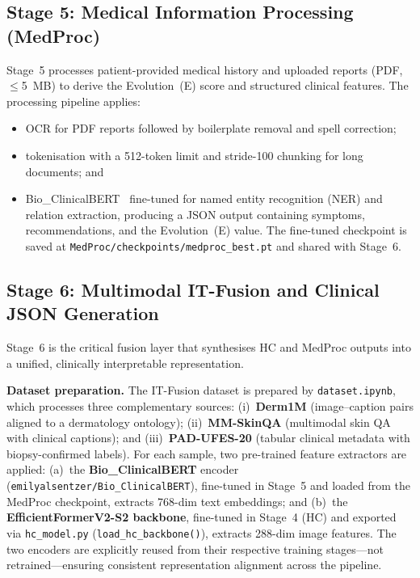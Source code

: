 \documentclass[conference]{IEEEtran}
\begin{document}
\subsection{Stage 5: Medical Information Processing (MedProc)}

Stage~5 processes patient-provided medical history and uploaded reports
(PDF, $\leq$5~MB) to derive the Evolution~(E) score and structured
clinical features. The processing pipeline applies:
\begin{itemize}[leftmargin=*]
    \item OCR for PDF reports followed by boilerplate removal and spell
          correction;
    \item tokenisation with a 512-token limit and stride-100 chunking
          for long documents; and
    \item Bio\_ClinicalBERT~\cite{alsentzer2019_bioclinicalbert} fine-tuned for named entity
          recognition (NER) and relation extraction, producing a JSON output
          containing symptoms, recommendations, and the Evolution~(E) value.
          The fine-tuned checkpoint is saved at
          \texttt{MedProc/checkpoints/medproc\_best.pt} and shared with Stage~6.
\end{itemize}

\subsection{Stage 6: Multimodal IT-Fusion and Clinical JSON Generation}

Stage~6 is the critical fusion layer that synthesises HC and MedProc
outputs into a unified, clinically interpretable representation.

\textbf{Dataset preparation.} The IT-Fusion dataset is prepared by
\texttt{dataset.ipynb}, which processes three complementary sources:
(i)~\textbf{Derm1M} (image--caption pairs aligned to a dermatology
ontology); (ii)~\textbf{MM-SkinQA} (multimodal skin QA with clinical
captions); and (iii)~\textbf{PAD-UFES-20} (tabular clinical metadata
with biopsy-confirmed labels). For each sample, two pre-trained feature
extractors are applied: (a)~the \textbf{Bio\_ClinicalBERT} encoder
(\texttt{emilyalsentzer/Bio\_ClinicalBERT}), fine-tuned in Stage~5
and loaded from the MedProc checkpoint, extracts 768-dim text
embeddings; and (b)~the \textbf{EfficientFormerV2-S2 backbone},
fine-tuned in Stage~4 (HC) and exported via \texttt{hc\_model.py}
(\texttt{load\_hc\_backbone()}), extracts 288-dim image features.
The two encoders are explicitly reused from their respective training
stages---not retrained---ensuring consistent representation alignment
across the pipeline.
\end{document}
